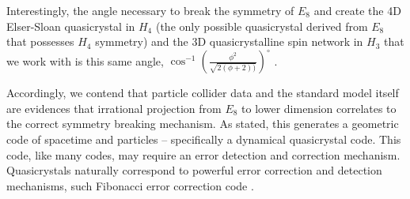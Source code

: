 \documentclass[submission,copyright,creativecommons]{eptcs}
\begin{document}
Interestingly, the angle necessary to break the symmetry of $E_{8}$ and create the 4D Elser-Sloan quasicrystal in $H_{4}$ (the only possible quasicrystal derived from $E_{8}$ that possesses $H_{4}$ symmetry) and the 3D quasicrystalline spin network in $H_{3}$ that we work with is this same angle, $\cos^{-1} \left (\frac{\phi^2}{\sqrt{2(\phi +2))}}  \right )^{\circ} $ \cite{fang2013cabinet}.

Accordingly, we contend that particle collider data and the standard model itself are evidences that irrational projection from $E_{8}$ to lower dimension correlates to the correct symmetry breaking mechanism. As stated, this generates a geometric code of spacetime and particles -- specifically a dynamical quasicrystal code. This code, like many codes, may require an error detection and correction mechanism. Quasicrystals naturally correspond to powerful error correction and detection mechanisms, such Fibonacci error correction code  \cite{esmaeili2010fibonacci}. 



\end{document}

